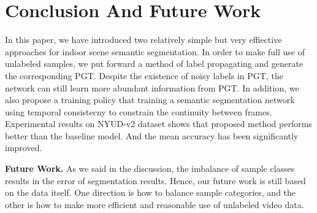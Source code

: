 \section{Conclusion And Future Work}
\label{sec:conclusion}
In this paper, we have introduced two relatively simple but very effiective approaches for indoor scene semantic segmentation.  
%
In order to make full use of unlabeled samples, we put forward a method of label propagating and generate the corresponding PGT.
%
Despite the existence of noisy labels in PGT, the network can still learn more abundant information from PGT.
%
In addition, we also propose a training policy that training a semantic segmentation network using temporal consistecny to constrain the continuity between frames.
%
Experimental results on NYUD-v2 dataset shows that proposed method performs
better than the baseline model. 
%
And the mean accuracy has been significantly improved.

{\bf Future Work.} As we said in the discussion, the imbalance of sample classes results in the error of segmentation results. 
%
Hence, our future work is still based on the data itself.
%
One direction is how to balance sample categories, and the other is how to make more efficient and reasonable use of unlabeled video data.

